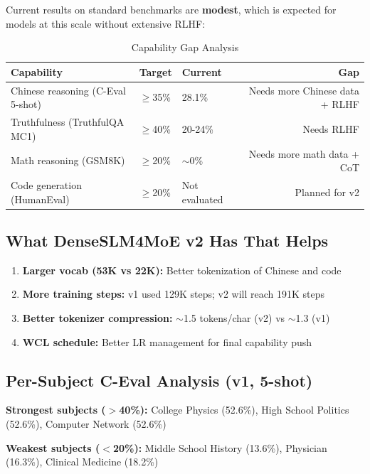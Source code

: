 Current results on standard benchmarks are \textbf{modest}, which is expected for models at this scale without extensive RLHF:

\begin{table}[h]
    \centering
    \caption{Capability Gap Analysis}
    \begin{tabular}{lllr}
        \toprule
        \textbf{Capability} & \textbf{Target} & \textbf{Current} & \textbf{Gap} \\
        \midrule
        Chinese reasoning (C-Eval 5-shot) \citep{ceval} & $\ge$35\% & 28.1\% & Needs more Chinese data + RLHF \\
        Truthfulness (TruthfulQA MC1) & $\ge$40\% & 20-24\% & Needs RLHF \\
        Math reasoning (GSM8K) & $\ge$20\% & $\sim$0\% & Needs more math data + CoT \\
        Code generation (HumanEval) \citep{humaneval} & $\ge$20\% & Not evaluated & Planned for v2 \\
        \bottomrule
    \end{tabular}
\end{table}

\subsection{What DenseSLM4MoE v2 Has That Helps}

\begin{enumerate}
    \item \textbf{Larger vocab (53K vs 22K):} Better tokenization of Chinese and code
    \item \textbf{More training steps:} v1 used 129K steps; v2 will reach 191K steps
    \item \textbf{Better tokenizer compression:} $\sim$1.5 tokens/char (v2) vs $\sim$1.3 (v1)
    \item \textbf{WCL schedule:} Better LR management for final capability push
\end{enumerate}

\subsection{Per-Subject C-Eval Analysis (v1, 5-shot)}

\textbf{Strongest subjects ($>$40\%):} College Physics (52.6\%), High School Politics (52.6\%), Computer Network (52.6\%)

\textbf{Weakest subjects ($<$20\%):} Middle School History (13.6\%), Physician (16.3\%), Clinical Medicine (18.2\%)

